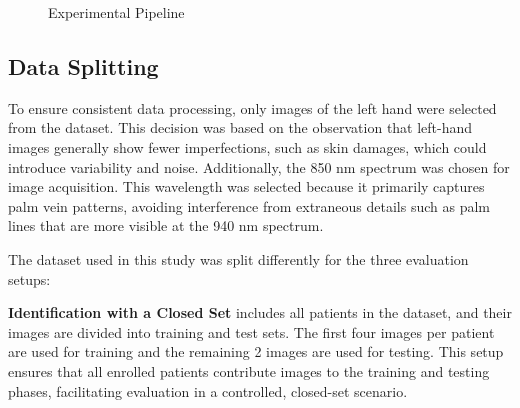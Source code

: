 \begin{figure}[!ht]
    \centering
    \caption{Experimental Pipeline}
\end{figure}

\subsection{Data Splitting}
To ensure consistent data processing, only images of the left hand were selected from the dataset. This decision was based on the observation that left-hand images generally show fewer imperfections, such as skin damages, which could introduce variability and noise. Additionally, the 850 nm spectrum was chosen for image acquisition. This wavelength was selected because it primarily captures palm vein patterns, avoiding interference from extraneous details such as palm lines that are more visible at the 940 nm spectrum.

The dataset used in this study was split differently for the three evaluation setups:

\textbf{Identification with a Closed Set} includes all patients in the dataset, and their images are divided into training and test sets. The first four images per patient are used for training and the remaining 2 images are used for testing. This setup ensures that all enrolled patients contribute images to the training and testing phases, facilitating evaluation in a controlled, closed-set scenario.

